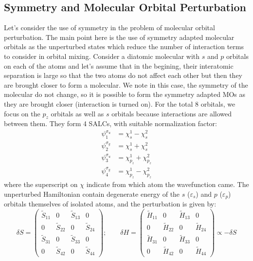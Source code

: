 \documentclass{article}
\begin{document}
\subsection{Symmetry and Molecular Orbital Perturbation}
Let's consider the use of symmetry in the problem of molecular orbital perturbation. 
The main point here is the use of symmetry adapted molecular orbitals as the 
unperturbed states which reduce the number of interaction terms to consider in 
orbital mixing. Consider a diatomic molecular with $s$ and $p$ orbitals 
on each of the atoms and let's assume that in the begining, their interatomic 
separation is large so that the two atoms do not affect each other but then 
they are brought closer to form a molecular. We note in this case, the symmetry 
of the molecular do not change, so it is possible to form the symmetry adapted 
MOs as they are brought closer (interaction is turned on). For the total 8 orbitals, we 
focus on the $p_z$ orbitals as well as $s$ orbitals because interactions are allowed 
between them. They form 4 SALCs, with suitable normalization factor:
\begin{align*}
    \psi_1^{\sigma_u} &= \chi_s^1 - \chi_s^2 \\ 
    \psi_2^{\sigma_g} &= \chi_s^1 + \chi_s^2 \\ 
    \psi_3^{\sigma_u} &= \chi_{p_z}^1 + \chi_{p_z}^2 \\ 
    \psi_4^{\sigma_g} &= \chi_{p_z}^1 - \chi_{p_z}^2 
\end{align*}
where the superscript on $\chi$ indicate from which atom the wavefunction came. 
The unperturbed Hamiltonian contain degenerate energy of the $s$ ($\varepsilon_s$) 
and $p$ ($\varepsilon_p$) orbitals 
themselves of isolated atoms, and the perturbation is given by:
\begin{equation}
    \delta S = \left(\begin{matrix}
        \tilde{S}_{11} & 0 & \tilde{S}_{13} & 0 \\ 
        0 & \tilde{S}_{22} & 0 & \tilde{S}_{24} \\ 
        \tilde{S}_{31} & 0 & \tilde{S}_{33} & 0 \\ 
        0 & \tilde{S}_{42} & 0 & \tilde{S}_{44}
    \end{matrix}\right); \qquad
    \delta H = \left(\begin{matrix}
        \tilde{H}_{11} & 0 & \tilde{H}_{13} & 0 \\ 
        0 & \tilde{H}_{22} & 0 & \tilde{H}_{24} \\ 
        \tilde{H}_{31} & 0 & \tilde{H}_{33} & 0 \\ 
        0 & \tilde{H}_{42} & 0 & \tilde{H}_{44}
    \end{matrix}\right) \propto - \delta S
\end{equation}
\end{document}
